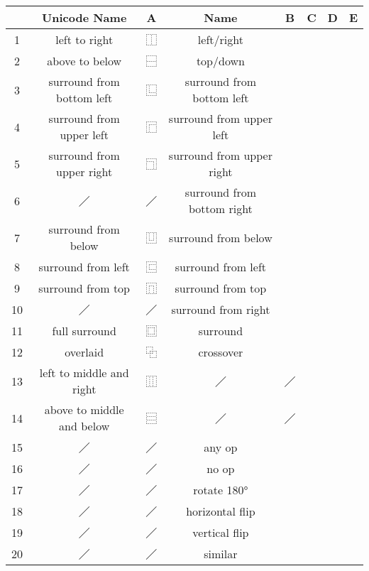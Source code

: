 
\begin{tabular}[pos]{ | c | c | c | c | c | c | c | c | }
\hline
 & {\mktsStyleBold{}Unicode Name} & {\mktsStyleBold{}A} & {\mktsStyleBold{}Name} & {\mktsStyleBold{}B} & {\mktsStyleBold{}C} & {\mktsStyleBold{}D} & {\mktsStyleBold{}E}\\

\hline
1 & left to right & {\cjk{}⿰} & left/right & {\cjk{}{\cnjzr{}}} & {\cjk{}{\cnjzr{}}} &  & {\cjk{}{\cnjzr{}}}\\
2 & above to below & {\cjk{}⿱} & top/down & {\cjk{}{\cnjzr{}}} & {\cjk{}{\cnjzr{}}} &  & {\cjk{}{\cnjzr{}}}\\
3 & surround from bottom left & {\cjk{}⿺} & surround from bottom left & {\cjk{}{\cnjzr{}}} & {\cjk{}{\cnjzr{}}} & {\cjk{}{\cnjzr{}}} & \\
4 & surround from upper left & {\cjk{}⿸} & surround from upper left & {\cjk{}{\cnjzr{}}} & {\cjk{}{\cnjzr{}}} &  & {\cjk{}{\cnjzr{}}}\\
5 & surround from upper right & {\cjk{}⿹} & surround from upper right & {\cjk{}{\cnjzr{}}} & {\cjk{}{\cnjzr{}}} &  & {\cjk{}{\cnjzr{}}}\\
6 & {\cjk{}／} & {\cjk{}／} & surround from bottom right & {\cjk{}{\cnjzr{}}} & {\cjk{}{\cnjzr{}}} &  & {\cjk{}{\cnjzr{}}}\\
7 & surround from below & {\cjk{}⿶} & surround from below & {\cjk{}{\cnjzr{}}} & {\cjk{}{\cnjzr{}}} &  & {\cjk{}{\cnjzr{}}}\\
8 & surround from left & {\cjk{}⿷} & surround from left & {\cjk{}{\cnjzr{}}} & {\cjk{}{\cnjzr{}}} &  & {\cjk{}{\cnjzr{}}}\\
9 & surround from top & {\cjk{}⿵} & surround from top & {\cjk{}{\cnjzr{}}} & {\cjk{}{\cnjzr{}}} &  & {\cjk{}{\cnjzr{}}}\\
10 & {\cjk{}／} & {\cjk{}／} & surround from right & {\cjk{}{\cnjzr{}}} & {\cjk{}{\cnjzr{}}} &  & {\cjk{}{\cnjzr{}}}\\
11 & full surround & {\cjk{}⿴} & surround & {\cjk{}{\cnjzr{}}} & {\cjk{}{\cnjzr{}}} &  & {\cjk{}{\cnjzr{}}}\\
12 & overlaid & {\cjk{}⿻} & crossover &  & {\cjk{}{\cnjzr{}}} &  & \\
13 & left to middle and right & {\cjk{}⿲} & {\cjk{}／} & {\cjk{}／} &  &  & \\
14 & above to middle and below & {\cjk{}⿳} & {\cjk{}／} & {\cjk{}／} &  &  & \\
15 & {\cjk{}／} & {\cjk{}／} & any op &  & {\cjk{}{\cnjzr{}}} &  & \\
16 & {\cjk{}／} & {\cjk{}／} & no op &  & {\cjk{}{\cnjzr{}}} &  & \\
17 & {\cjk{}／} & {\cjk{}／} & rotate 180° &  & {\cjk{}{\cnjzr{}}} &  & \\
18 & {\cjk{}／} & {\cjk{}／} & horizontal flip &  & {\cjk{}{\cnjzr{}}} &  & \\
19 & {\cjk{}／} & {\cjk{}／} & vertical flip &  & {\cjk{}{\cnjzr{}}} &  & \\
20 & {\cjk{}／} & {\cjk{}／} & similar &  & {\cjk{}{\cnjzr{}}} &  & \\
\hline
\end{tabular}
\mktsShowpar\par


